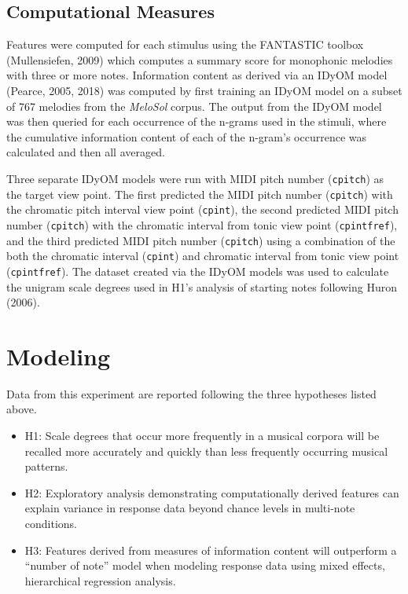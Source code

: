 \documentclass[english,man,floatsintext]{apa6}
\providecommand{\tightlist}{%
  \setlength{\itemsep}{0pt}\setlength{\parskip}{0pt}}
\begin{document}
\hypertarget{computational-measures}{%
\subsection{Computational Measures}\label{computational-measures}}

Features were computed for each stimulus using the FANTASTIC toolbox (Mullensiefen, 2009) which computes a summary score for monophonic melodies with three or more notes.
Information content as derived via an IDyOM model (Pearce, 2005, 2018) was computed by first training an IDyOM model on a subset of 767 melodies from the \emph{MeloSol} corpus.
The output from the IDyOM model was then queried for each occurrence of the n-grams used in the stimuli, where the cumulative information content of each of the n-gram's occurrence was calculated and then all averaged.

Three separate IDyOM models were run with MIDI pitch number (\texttt{cpitch}) as the target view point.
The first predicted the MIDI pitch number (\texttt{cpitch}) with the chromatic pitch interval view point (\texttt{cpint}), the second predicted MIDI pitch number (\texttt{cpitch}) with the chromatic interval from tonic view point (\texttt{cpintfref}), and the third predicted MIDI pitch number (\texttt{cpitch}) using a combination of the both the chromatic interval (\texttt{cpint}) and chromatic interval from tonic view point (\texttt{cpintfref}).
The dataset created via the IDyOM models was used to calculate the unigram scale degrees used in H1's analysis of starting notes following Huron (2006).

\hypertarget{modeling}{%
\section{Modeling}\label{modeling}}

Data from this experiment are reported following the three hypotheses listed above.

\begin{itemize}
\tightlist
\item
  H1: Scale degrees that occur more frequently in a musical corpora will be recalled more accurately and quickly than less frequently occurring musical patterns.
\item
  H2: Exploratory analysis demonstrating computationally derived features can explain variance in response data beyond chance levels in multi-note conditions.\\
\item
  H3: Features derived from measures of information content will outperform a \enquote{number of note} model when modeling response data using mixed effects, hierarchical regression analysis.
\end{itemize}
\end{document}
